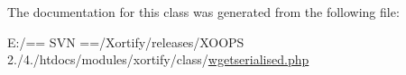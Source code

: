 The documentation for this class was generated from the following file\-:\begin{DoxyCompactItemize}
\item 
E\-:/== S\-V\-N ==/\-Xortify/releases/\-X\-O\-O\-P\-S 2./4./htdocs/modules/xortify/class/\hyperlink{wgetserialised_8php}{wgetserialised.\-php}\end{DoxyCompactItemize}
